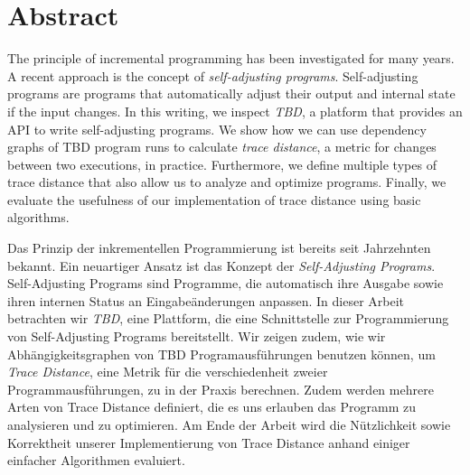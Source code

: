 \documentclass{thesisclass}
\begin{document}
\chapter*{Abstract}
The principle of incremental programming has been investigated for many years. A recent approach is the concept of \textit{self-adjusting programs}. Self-adjusting programs are programs that automatically adjust their output and internal state if the input changes. In this writing, we inspect \textit{TBD}, a platform that provides an API to write self-adjusting programs. We show how we can use dependency graphs of TBD program runs to calculate \textit{trace distance}, a metric for changes between two executions, in practice. Furthermore, we define multiple types of trace distance that also allow us to analyze and optimize programs. Finally, we evaluate the usefulness of our implementation of trace distance using basic algorithms. 

\vspace{10 mm}

Das Prinzip der inkrementellen Programmierung ist bereits seit Jahrzehnten bekannt. Ein neuartiger Ansatz ist das Konzept der \textit{Self-Adjusting Programs}. Self-Adjusting Programs sind Programme, die automatisch ihre Ausgabe sowie ihren internen Status an Eingabe\"anderungen anpassen. In dieser Arbeit betrachten wir \textit{TBD}, eine Plattform, die eine Schnittstelle zur Programmierung von Self-Adjusting Programs bereitstellt. Wir zeigen zudem, wie wir Abh\"angigkeitsgraphen von TBD Programausf\"uhrungen benutzen k\"onnen, um \textit{Trace Distance}, eine Metrik f\"ur die verschiedenheit zweier Programmausf\"uhrungen, zu in der Praxis berechnen. Zudem werden mehrere Arten von Trace Distance definiert, die es uns erlauben das Programm zu analysieren und zu optimieren. Am Ende der Arbeit wird die N\"utzlichkeit sowie Korrektheit unserer Implementierung von Trace Distance anhand einiger einfacher Algorithmen evaluiert. 


\tableofcontents
\blankpage


\mainmatter
{}

%


\cleardoublepage
{}
{}

{}	%
{}	%
												  




\cleardoublepage


\end{document}
